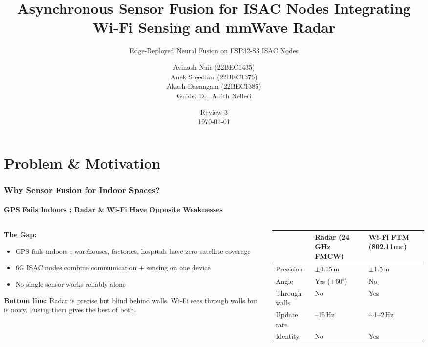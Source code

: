 \documentclass[
	11pt,
	aspectratio=169,
]{beamer}
\title[ML Sensor Fusion]{Asynchronous Sensor Fusion for ISAC Nodes Integrating Wi-Fi Sensing and mmWave Radar}
\subtitle{Edge-Deployed Neural Fusion on ESP32-S3 ISAC Nodes}
\author[VIT Chennai]{Avinash Nair (22BEC1435) \\ Anek Sreedhar (22BEC1376) \\ Akash Dasangam (22BEC1386) \\ \medskip \small Guide: Dr.\ Anith Nelleri}
\institute[]{Dept.\ of Electronics and Communication Engineering \\ \smallskip VIT Chennai}
\date[Mar 2026]{Review-3 \\ \today}
\begin{document}

\begin{frame}[plain]
	\titlepage
\end{frame}


\section{Problem \& Motivation}

\begin{frame}
	\frametitle{Why Sensor Fusion for Indoor Spaces?}
	\framesubtitle{GPS Fails Indoors ; Radar \& Wi-Fi Have Opposite Weaknesses}

	\begin{columns}[c]
		\begin{column}{0.50\textwidth}
			\scriptsize
			\textbf{The Gap:}
			\begin{itemize}
				\item GPS fails indoors ; warehouses, factories, hospitals have \alert{zero} satellite coverage
				\item 6G ISAC nodes combine communication + sensing on one device
				\item No single sensor works reliably alone
			\end{itemize}

			\medskip
			\textbf{Bottom line:} Radar is precise but blind behind walls. Wi-Fi sees through walls but is noisy. \alert{Fusing them} gives the best of both.
		\end{column}

		\begin{column}{0.47\textwidth}
			\centering
			\scriptsize
			\begin{tabular}{>{\raggedright}p{1.2cm} >{\centering}p{1.8cm} >{\centering\arraybackslash}p{1.8cm}}
				\toprule
				& \textbf{Radar} \newline (24\,GHz FMCW) & \textbf{Wi-Fi FTM} \newline (802.11mc) \\
				\midrule
				Precision & $\pm$0.15\,m & $\pm$1.5\,m \\
				Angle & Yes ($\pm$60$^{\circ}$) & No \\
				Through walls & \alert{No} & \alert{Yes} \\
				Update rate & 10--15\,Hz & $\sim$1--2\,Hz \\
				Identity & No & Yes \\
				\bottomrule
			\end{tabular}
		\end{column}
	\end{columns}
\end{frame}
\end{document}
